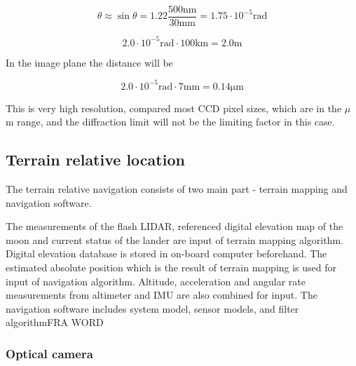\begin{equation}
\theta\approx \sin \theta=1.22 \dfrac{500 \mathrm{nm}}{30 \mathrm{mm}} = 1.75 \cdot 10^{-5} \mathrm{rad}
\end{equation} 


\begin{equation}
2.0 \cdot 10 ^{-5} \mathrm{rad} \cdot 100 \mathrm{km} = 2.0 \mathrm{m} 
\end{equation}

In the image plane the distance will be

\begin{equation}
2.0 \cdot 10 ^{-5} \mathrm{rad} \cdot 7 \mathrm{mm} = 0.14 \mathrm{\mu m} 
\end{equation}

This is very high resolution, compared most CCD pixel sizes, which are in the $\mu$ m range, and the diffraction limit will not be the limiting factor in this case. 



\subsection{Terrain relative location}


The terrain relative navigation consists of two main part - terrain mapping and navigation software.

 The measurements of the flash LIDAR, referenced digital elevation map of the moon and current status of the lander are input of terrain mapping algorithm. Digital elevation database is stored in on-board computer beforehand. The estimated absolute position which is the result of terrain mapping is used for input of navigation algorithm. Altitude, acceleration and angular rate measurements from altimeter and IMU are also combined for input. The navigation software includes system model, sensor models, and filter algorithmFRA WORD


\subsubsection{Optical camera}

